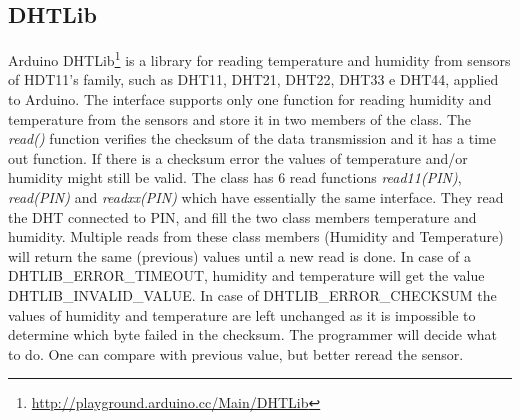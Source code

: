\documentclass{acm_proc_article-sp}
\begin{document}
\subsection{DHTLib}
Arduino DHTLib\footnote{\url{http://playground.arduino.cc/Main/DHTLib}} is a library for reading temperature and humidity from sensors of HDT11's family, such as DHT11, DHT21, DHT22, DHT33 e DHT44, applied to Arduino. 
\newline
\newline
The interface supports only one function for reading humidity and temperature from the sensors and store it in two members of the class. The \textit{read()} function verifies the checksum of the data transmission and it has a time out function. If there is a checksum error the values of temperature and/or humidity might still be valid.
\newline
\newline
The class has 6 read functions \textit{read11(PIN)}, \textit{read(PIN)} and \textit{readxx(PIN)} which have essentially the same interface. They read the DHT connected to PIN, and fill the two class members temperature and humidity. Multiple reads from these class members (Humidity and Temperature) will return the same (previous) values until a new read is done.
\newline
\newline
In case of a DHTLIB\_ERROR\_TIMEOUT, humidity and temperature will get the value DHTLIB\_INVALID\_VALUE. In case of DHTLIB\_ERROR\_CHECKSUM the values of humidity and temperature are left unchanged as it is impossible to determine which byte failed in the checksum. The programmer will decide what to do. One can compare with previous value, but better reread the sensor.
\newline
\newline
\end{document}
